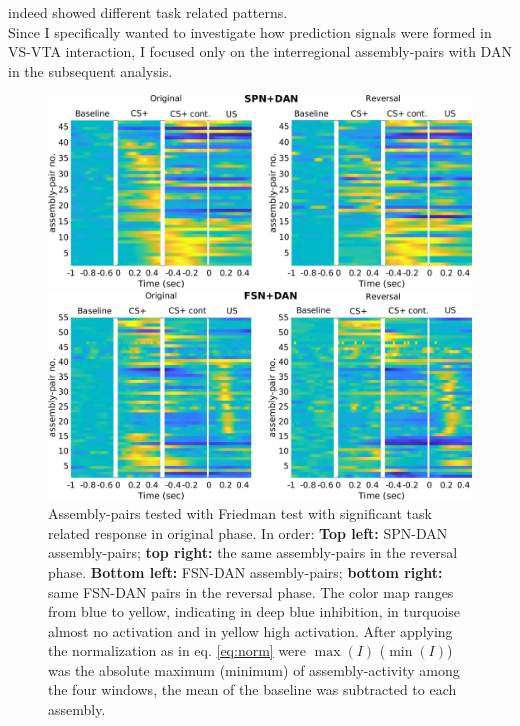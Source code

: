 indeed showed different task related patterns.\\Since I specifically wanted to investigate how prediction signals were formed in VS-VTA interaction, I focused only on the interregional assembly-pairs with DAN in the subsequent analysis.
 \begin{figure}[H]
     \centering
     \includegraphics[scale=0.32]{figures/SPN_DAN.pdf}
     
     \vspace{1cm}
     
     \includegraphics[scale=0.32]{figures/HeatFSN_DAN.pdf}
     \caption{Assembly-pairs tested with Friedman test with significant task related response in original phase. In order: \textbf{Top left:} SPN-DAN assembly-pairs; \textbf{top right:} the same assembly-pairs in the reversal phase. \textbf{Bottom left:} FSN-DAN assembly-pairs; \textbf{bottom right:} same FSN-DAN pairs in the reversal phase. The color map ranges from blue to yellow, indicating in deep blue inhibition, in turquoise almost no activation and in yellow high activation. After applying the normalization as in eq. \ref{eq:norm} were $\max(I)$ ($\min(I)$) was the absolute maximum (minimum) of assembly-activity among the four windows, the mean of the baseline was subtracted to each assembly.}
     \label{fig:HeatPairsDan}
 \end{figure}
